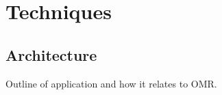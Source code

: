 \chapter{Techniques}
\label{sec:techniques}

\section{Architecture}

Outline of application and how it relates to OMR.




